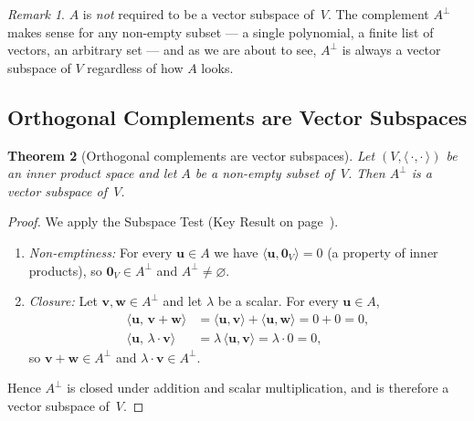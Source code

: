\documentclass[11pt, a4paper, notitlepage]{report}
\newtheorem{theorem}{Theorem}[section]
\theoremstyle{definition}
\theoremstyle{remark}
\newtheorem{remark}[theorem]{Remark}
\begin{document}
\begin{remark}
$A$ is \emph{not} required to be a vector subspace of~$V$. The complement
$A^\perp$ makes sense for any non-empty subset --- a single polynomial, a
finite list of vectors, an arbitrary set --- and as we are about to see,
$A^\perp$ is always a vector subspace of $V$ regardless of how $A$ looks.
\end{remark}

\subsection{Orthogonal Complements are Vector Subspaces}
\label{subsec:orth-comp-subspace}

\begin{theorem}[Orthogonal complements are vector subspaces]
\label{thm:orth-comp-subspace}
Let $(V,\langle\,\cdot,\cdot\,\rangle)$ be an inner product space and let
$A$ be a non-empty subset of~$V$. Then $A^\perp$ is a vector subspace of~$V$.
\end{theorem}

\begin{proof}
We apply the Subspace Test (Key Result on page~\pageref{def:subspace}).
\begin{enumerate}
  \item \textit{Non-emptiness:} For every $\mathbf{u}\in A$ we have
        $\langle\mathbf{u},\mathbf{0}_V\rangle = 0$ (a property of inner
        products), so $\mathbf{0}_V\in A^\perp$ and $A^\perp\neq\varnothing$.
  \item \textit{Closure:} Let $\mathbf{v},\mathbf{w}\in A^\perp$ and let
        $\lambda$ be a scalar. For every $\mathbf{u}\in A$,
        \begin{align*}
          \langle\mathbf{u},\,\mathbf{v}+\mathbf{w}\rangle
            &= \langle\mathbf{u},\mathbf{v}\rangle + \langle\mathbf{u},\mathbf{w}\rangle
             = 0 + 0 = 0,\\
          \langle\mathbf{u},\,\lambda\cdot\mathbf{v}\rangle
            &= \lambda\,\langle\mathbf{u},\mathbf{v}\rangle = \lambda\cdot 0 = 0,
        \end{align*}
        so $\mathbf{v}+\mathbf{w}\in A^\perp$ and $\lambda\cdot\mathbf{v}\in A^\perp$.
\end{enumerate}
Hence $A^\perp$ is closed under addition and scalar multiplication, and is
therefore a vector subspace of~$V$.
\end{proof}
\end{document}

